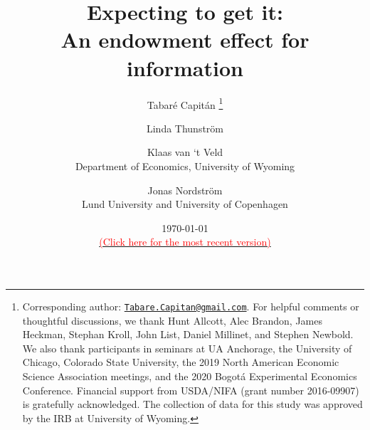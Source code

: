 
\title{\vspace{-3cm}
      Expecting to get it: \\ An endowment effect for information
      }


\author{Tabaré Capitán
          \thanks{Corresponding author: \href{mailto:Tabare.Capitan@gmail.com}{\texttt{Tabare.Capitan@gmail.com}}. For helpful comments or thoughtful discussions, we thank Hunt Allcott, Alec Brandon, James Heckman, Stephan Kroll, John List, Daniel Millinet, and Stephen Newbold. We also thank participants in seminars at UA Anchorage, the University of Chicago, Colorado State University, the 2019 North American Economic Science Association meetings, and the 2020 Bogotá Experimental Economics Conference. Financial support from USDA/NIFA (grant number 2016-09907) is gratefully acknowledged. The collection of data for this study was approved by the IRB at University of Wyoming.}
        \and
        Linda Thunström
        \and
        Klaas van ‘t Veld
          \\ \small{Department of Economics, University of Wyoming}
        \and
        Jonas Nordström
          \\ \small{Lund University and University of Copenhagen}
        }

\date{\today \\\href{https://www.tabarecapitan.com/jmp/}{\small{\textcolor{red}{(Click here for the most recent version)}}}}

\maketitle

\thispagestyle{empty}   %

